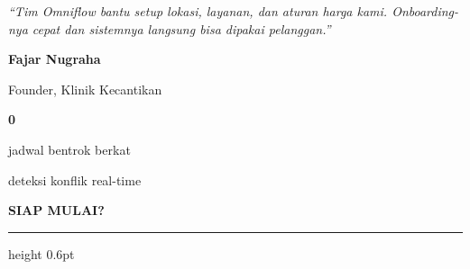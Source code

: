 \documentclass[a4paper]{article}
\newcommand{\sectiontitle}[1]{%
    \vspace{10pt}%
    {\fontsize{13}{16}\selectfont\bfseries\color{BlueDark} #1}\par\vspace{3pt}%
    {\color{BluePrimary}\hrule height 0.6pt}\par\vspace{8pt}%
}
\begin{document}
\noindent
\begin{minipage}[t]{0.485\textwidth}
    \colorbox{BlueBg}{%
        \begin{minipage}{\dimexpr\linewidth-2\fboxsep\relax}
            {\fontsize{9.5}{13}\selectfont\color{TextDark}\textit{``Tim Omniflow bantu setup lokasi, layanan, dan aturan harga kami. Onboarding-nya cepat dan sistemnya langsung bisa dipakai pelanggan.''}}\par\vspace{4pt}
            {\fontsize{8.5}{11}\selectfont\bfseries\color{BluePrimary} Fajar Nugraha}\par
            {\fontsize{8}{10}\selectfont\color{TextLight} Founder, Klinik Kecantikan}
        \end{minipage}}
\end{minipage}%
\hfill
\begin{minipage}[t]{0.485\textwidth}
    \colorbox{BlueBg}{%
        \begin{minipage}{\dimexpr\linewidth-2\fboxsep\relax}
            \begin{center}
                {\fontsize{20}{24}\selectfont\bfseries\color{BluePrimary} 0}\par
                {\fontsize{9.5}{12}\selectfont\color{TextDark} jadwal bentrok berkat}\par
                {\fontsize{9.5}{12}\selectfont\color{TextDark} deteksi konflik real-time}
            \end{center}
        \end{minipage}}
\end{minipage}

\sectiontitle{SIAP MULAI?}
\end{document}

